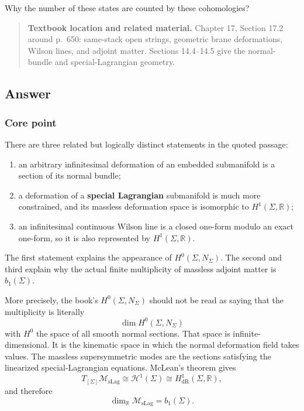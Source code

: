 \documentclass[
  10pt,
  a4paper,
  openany]{book}
\providecommand{\tightlist}{%
  \setlength{\itemsep}{0pt}\setlength{\parskip}{0pt}}
\begin{document}
Why the number of these states are counted by these cohomologies?

\begin{quote}
\textbf{Textbook location and related material.} Chapter 17, Section
17.2 around p.~650: same-stack open strings, geometric brane
deformations, Wilson lines, and adjoint matter. Sections 14.4--14.5 give
the normal-bundle and special-Lagrangian geometry.
\end{quote}

\subsection{Answer}\label{answer-34}

\subsubsection{Core point}\label{core-point-34}

There are three related but logically distinct statements in the quoted
passage:

\begin{enumerate}
\def\labelenumi{\arabic{enumi}.}
\tightlist
\item
  an arbitrary infinitesimal deformation of an embedded submanifold is a
  section of its normal bundle;
\item
  a deformation of a \textbf{special Lagrangian} submanifold is much
  more constrained, and its massless deformation space is isomorphic to
  \(H^1(\Sigma,\mathbb R)\);
\item
  an infinitesimal continuous Wilson line is a closed one-form modulo an
  exact one-form, so it is also represented by
  \(H^1(\Sigma,\mathbb R)\).
\end{enumerate}

The first statement explains the appearance of \(H^0(\Sigma,N_\Sigma)\).
The second and third explain why the actual finite multiplicity of
massless adjoint matter is \(b_1(\Sigma)\).

More precisely, the book's \(H^0(\Sigma,N_\Sigma)\) should not be read
as saying that the multiplicity is literally \[
\dim H^0(\Sigma,N_\Sigma)
\] with \(H^0\) the space of all smooth normal sections. That space is
infinite-dimensional. It is the kinematic space in which the normal
deformation field takes values. The massless supersymmetric modes are
the sections satisfying the linearized special-Lagrangian equations.
McLean's theorem gives \[
\boxed{
T_{[\Sigma]}\mathcal M_{\mathrm{sLag}}
\cong
\mathcal H^1(\Sigma)
\cong
H^1_{\mathrm{dR}}(\Sigma,\mathbb R)
},
\] and therefore \[
\dim_{\mathbb R}\mathcal M_{\mathrm{sLag}}=b_1(\Sigma).
\]
\end{document}
